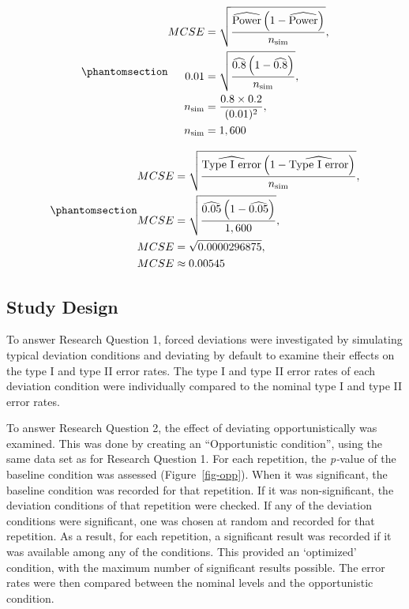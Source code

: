 \documentclass[
  man,
  floatsintext,
  longtable,
  nolmodern,
  notxfonts,
  notimes,
  colorlinks=true,linkcolor=blue,citecolor=blue,urlcolor=blue]{apa7}
\begin{document}
\begin{equation}\phantomsection\label{eq-mcsepower}{
\begin{aligned}
MCSE &= \sqrt{\frac{\widehat{\text{Power}}\left(1-\widehat{\text{Power}}\right)}{n_{\text{sim}}}},\\
0.01 &= \sqrt{\frac{\widehat{\text{0.8}}\left(1-\widehat{\text{0.8}}\right)}{n_{\text{sim}}}}, \\
n_\text{sim} &= \frac{0.8 \times 0.2}{(0.01)^2},\\
n_\text{sim} &= 1,600
\end{aligned}
}\end{equation}

\begin{equation}\phantomsection\label{eq-mcsetypeI}{
\begin{aligned}
MCSE &= \sqrt{\frac{\widehat{\text{Type I error}}\left(1-\widehat{\text{Type I error}}\right)}{n_{\text{sim}}}},\\
MCSE &= \sqrt{\frac{\widehat{\text{0.05}}\left(1-\widehat{\text{0.05}}\right)}{1,600}}, \\
MCSE &= \sqrt{0.0000296875},\\
MCSE &\approx 0.00545
\end{aligned}
}\end{equation}

\subsection{Study Design}\label{study-design}

To answer Research Question 1, forced deviations were investigated by
simulating typical deviation conditions and deviating by default to
examine their effects on the type I and type II error rates. The type I
and type II error rates of each deviation condition were individually
compared to the nominal type I and type II error rates.

To answer Research Question 2, the effect of deviating opportunistically
was examined. This was done by creating an ``Opportunistic condition'',
using the same data set as for Research Question 1. For each repetition,
the \emph{p-}value of the baseline condition was assessed
(Figure~\ref{fig-opp}). When it was significant, the baseline condition
was recorded for that repetition. If it was non-significant, the
deviation conditions of that repetition were checked. If any of the
deviation conditions were significant, one was chosen at random and
recorded for that repetition. As a result, for each repetition, a
significant result was recorded if it was available among any of the
conditions. This provided an `optimized' condition, with the maximum
number of significant results possible. The error rates were then
compared between the nominal levels and the opportunistic condition.
\end{document}
